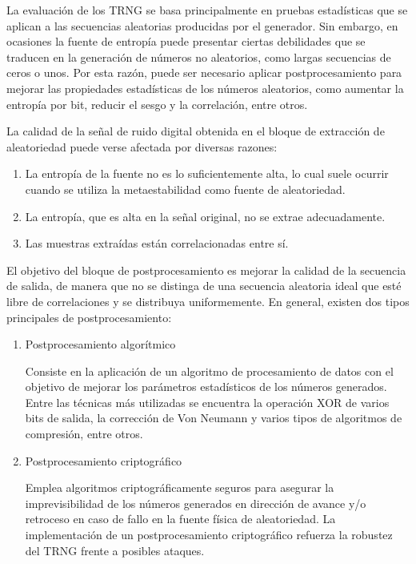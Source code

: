             La evaluación de los TRNG se basa principalmente en pruebas estadísticas que se aplican a las secuencias aleatorias producidas por el generador. Sin embargo, en ocasiones la fuente de entropía puede presentar ciertas debilidades que se traducen en la generación de números no aleatorios, como largas secuencias de ceros o unos. Por esta razón, puede ser necesario aplicar postprocesamiento para mejorar las propiedades estadísticas de los números aleatorios, como aumentar la entropía por bit, reducir el sesgo y la correlación, entre otros.
                
            La calidad de la señal de ruido digital obtenida en el bloque de extracción de aleatoriedad puede verse afectada por diversas razones:

            \begin{enumerate}[noitemsep, label=(\alph*)]
                \item La entropía de la fuente no es lo suficientemente alta, lo cual suele ocurrir cuando se utiliza la metaestabilidad como fuente de aleatoriedad.
                \item La entropía, que es alta en la señal original, no se extrae adecuadamente.
                \item Las muestras extraídas están correlacionadas entre sí. 
            \end{enumerate}		

	
	        El objetivo del bloque de postprocesamiento es mejorar la calidad de la secuencia de salida, de manera que no se distinga de una secuencia aleatoria ideal que esté libre de correlaciones y se distribuya uniformemente. En general, existen dos tipos principales de postprocesamiento:

            \begin{enumerate}
                \item Postprocesamiento algorítmico

                    Consiste en la aplicación de un algoritmo de procesamiento de datos con el objetivo de mejorar los parámetros estadísticos de los números generados. Entre las técnicas más utilizadas se encuentra la operación XOR de varios bits de salida, la corrección de Von Neumann y varios tipos de algoritmos de compresión, entre otros.
                \item Postprocesamiento criptográfico 

                    Emplea algoritmos criptográficamente seguros para asegurar la imprevisibilidad de los números generados en dirección de avance y/o retroceso en caso de fallo en la fuente física de aleatoriedad. La implementación de un postprocesamiento criptográfico refuerza la robustez del TRNG frente a posibles ataques.
            \end{enumerate}
    
